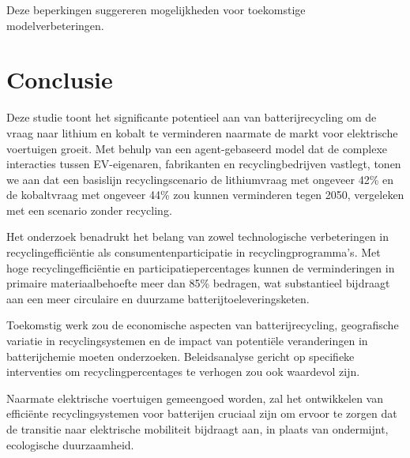 \documentclass[10pt,a4paper,twocolumn]{article}
\begin{document}
Deze beperkingen suggereren mogelijkheden voor toekomstige modelverbeteringen.

\section{Conclusie}
\label{sec:conclusion}

Deze studie toont het significante potentieel aan van batterijrecycling om de vraag naar lithium en kobalt te verminderen naarmate de markt voor elektrische voertuigen groeit. Met behulp van een agent-gebaseerd model dat de complexe interacties tussen EV-eigenaren, fabrikanten en recyclingbedrijven vastlegt, tonen we aan dat een basislijn recyclingscenario de lithiumvraag met ongeveer 42\% en de kobaltvraag met ongeveer 44\% zou kunnen verminderen tegen 2050, vergeleken met een scenario zonder recycling.

Het onderzoek benadrukt het belang van zowel technologische verbeteringen in recyclingefficiëntie als consumentenparticipatie in recyclingprogramma's. Met hoge recyclingefficiëntie en participatiepercentages kunnen de verminderingen in primaire materiaalbehoefte meer dan 85\% bedragen, wat substantieel bijdraagt aan een meer circulaire en duurzame batterijtoeleveringsketen.

Toekomstig werk zou de economische aspecten van batterijrecycling, geografische variatie in recyclingsystemen en de impact van potentiële veranderingen in batterijchemie moeten onderzoeken. Beleidsanalyse gericht op specifieke interventies om recyclingpercentages te verhogen zou ook waardevol zijn.

Naarmate elektrische voertuigen gemeengoed worden, zal het ontwikkelen van efficiënte recyclingsystemen voor batterijen cruciaal zijn om ervoor te zorgen dat de transitie naar elektrische mobiliteit bijdraagt aan, in plaats van ondermijnt, ecologische duurzaamheid.
\end{document}
